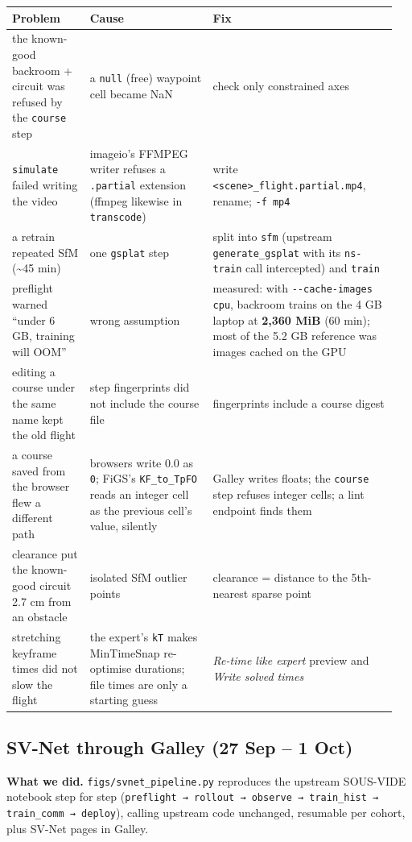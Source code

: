 \documentclass[11pt,a4paper]{article}
\newcommand{\code}[1]{\texttt{#1}}
\begin{document}
\begin{center}\small
\begin{tabular}{@{}>{\raggedright\arraybackslash}p{0.190\linewidth}>{\raggedright\arraybackslash}p{0.308\linewidth}>{\raggedright\arraybackslash}p{0.450\linewidth}@{}}
\toprule
\textbf{Problem} & \textbf{Cause} & \textbf{Fix} \\
\midrule
the known-good backroom + circuit was refused by the \code{course} step & a \code{null} (free) waypoint cell became NaN & check only constrained axes \\
\code{simulate} failed writing the video & imageio's FFMPEG writer refuses a \code{.partial} extension (ffmpeg likewise in \code{transcode}) & write \code{<scene>\_\allowbreak{}flight.partial.mp4}, rename; \code{-f mp4} \\
a retrain repeated SfM (\textasciitilde{}45 min) & one \code{gsplat} step & split into \code{sfm} (upstream \code{generate\_\allowbreak{}gsplat} with its \code{ns-train} call intercepted) and \code{train} \\
preflight warned ``under 6 GB, training will OOM'' & wrong assumption & measured: with \code{-{}-cache-images cpu}, backroom trains on the 4 GB laptop at \textbf{2,360 MiB} (60 min); most of the 5.2 GB reference was images cached on the GPU \\
editing a course under the same name kept the old flight & step fingerprints did not include the course file & fingerprints include a course digest \\
a course saved from the browser flew a different path & browsers write 0.0 as \code{0}; FiGS's \code{KF\_\allowbreak{}to\_\allowbreak{}TpFO} reads an integer cell as the previous cell's value, silently & Galley writes floats; the \code{course} step refuses integer cells; a lint endpoint finds them \\
clearance put the known-good circuit 2.7 cm from an obstacle & isolated SfM outlier points & clearance = distance to the 5th-nearest sparse point \\
stretching keyframe times did not slow the flight & the expert's \code{kT} makes MinTimeSnap re-optimise durations; file times are only a starting guess & \emph{Re-time like expert} preview and \emph{Write solved times} \\
\bottomrule
\end{tabular}
\end{center}
\subsection{SV-Net through Galley (27 Sep – 1 Oct)}
\textbf{What we did.} \code{figs/\allowbreak{}svnet\_\allowbreak{}pipeline.py} reproduces the upstream SOUS-VIDE notebook step for step (\code{preflight → rollout → observe → train\_\allowbreak{}hist → train\_\allowbreak{}comm → deploy}), calling upstream code unchanged, resumable per cohort, plus SV-Net pages in Galley.
\end{document}
